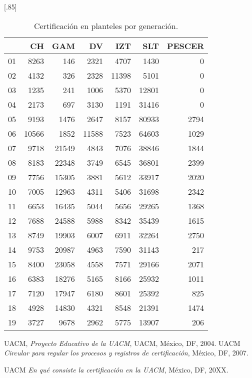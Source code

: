 \documentclass[12pt]{article}
\begin{document}
\begin{table}[ht]
\centering
\scalebox{0.75}[.85]{
\begin{tabular}{rrrrrrr}
  \hline
 & CH & GAM & DV & IZT & SLT & PESCER \\ 
  \hline
01 & 8263 & 146 & 2321 & 4707 & 1430 &   0 \\ 
  02 & 4132 & 326 & 2328 & 11398 & 5101 &   0 \\ 
  03 & 1235 & 241 & 1006 & 5370 & 12801 &   0 \\ 
  04 & 2173 & 697 & 3130 & 1191 & 31416 &   0 \\ 
  05 & 9193 & 1476 & 2647 & 8157 & 80933 & 2794 \\ 
  06 & 10566 & 1852 & 11588 & 7523 & 64603 & 1029 \\ 
  07 & 9718 & 21549 & 4843 & 7076 & 38846 & 1844 \\ 
  08 & 8183 & 22348 & 3749 & 6545 & 36801 & 2399 \\ 
  09 & 7756 & 15305 & 3881 & 5612 & 33917 & 2020 \\ 
  10 & 7005 & 12963 & 4311 & 5406 & 31698 & 2342 \\ 
  11 & 6653 & 16435 & 5044 & 5656 & 29265 & 1368 \\ 
  12 & 7688 & 24588 & 5988 & 8342 & 35439 & 1615 \\ 
  13 & 8749 & 19903 & 6007 & 6911 & 32264 & 2750 \\ 
  14 & 9753 & 20987 & 4963 & 7590 & 31143 & 217 \\ 
  15 & 8400 & 23058 & 4558 & 7571 & 29166 & 2071 \\ 
  16 & 6383 & 18276 & 5165 & 8166 & 25932 & 1011 \\ 
  17 & 7120 & 17947 & 6180 & 8601 & 25392 & 825 \\ 
  18 & 4928 & 14830 & 4321 & 8548 & 21391 & 1474 \\ 
  19 & 3727 & 9678 & 2962 & 5775 & 13907 & 206 \\ 
   \hline
\end{tabular}}
\caption{\label{Cert_Gen_Plantel}Certificaci\'on en planteles por generaci\'on.}
\end{table}




\begin{thebibliography}{20}
 \textsc{UACM},
\textit{Proyecto Educativo de la UACM},
UACM, M\'exico, DF, 2004.
 \textsc{UACM} 
\textit{Circular para regular los procesos y registros de certificaci\'on}, M\'exico, DF, 2007.

 \textsc{UACM} 
\textit{En qu\'e consiste la certificaci\'on en la UACM}, M\'exico, DF, 20XX.


\end{thebibliography}
\end{document}
